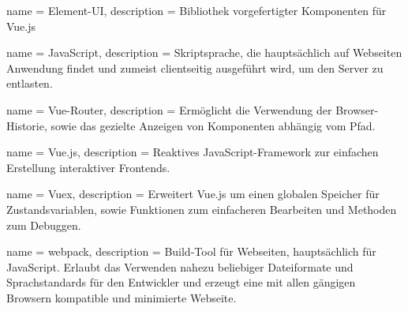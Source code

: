  {
    name = Element-UI,
    description = {
        Bibliothek vorgefertigter Komponenten für Vue.js
    }
}

 {
    name = JavaScript,
    description = {
        Skriptsprache, die hauptsächlich auf Webseiten Anwendung findet und zumeist clientseitig ausgeführt wird, um den Server zu entlasten.
    }
}

 {
    name = Vue-Router,
    description = {
        Ermöglicht die Verwendung der Browser-Historie, sowie das gezielte Anzeigen von Komponenten abhängig vom Pfad.
    }
}

 {
    name = Vue.js,
    description = {
        Reaktives JavaScript-Framework zur einfachen Erstellung interaktiver Frontends.
    }
}

 {
    name = Vuex,
    description = {
        Erweitert Vue.js um einen globalen Speicher für Zustandsvariablen, sowie Funktionen zum einfacheren Bearbeiten und Methoden zum Debuggen.
    }
}

 {
    name = webpack,
    description = {
        Build-Tool für Webseiten, hauptsächlich für JavaScript. Erlaubt das Verwenden nahezu beliebiger Dateiformate und Sprachstandards für den Entwickler und erzeugt eine mit allen gängigen Browsern kompatible und minimierte Webseite.
    }
}
